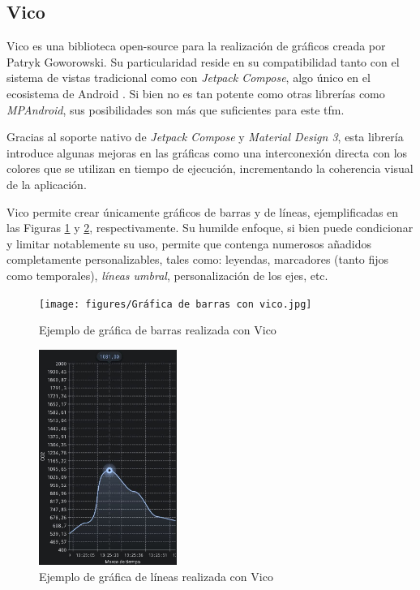     \subsection{Vico}
        
        Vico es una biblioteca \gls{open-source} para la realización de gráficos creada por Patryk Goworowski. Su particularidad reside en su compatibilidad tanto con el sistema de vistas tradicional como con \textit{Jetpack Compose}, algo único en el ecosistema de Android \cite{goworowski_vico_nodate}. Si bien no es tan potente como otras librerías como \textit{MPAndroid}, sus posibilidades son más que suficientes para este \gls{tfm}. 
        
        Gracias al soporte nativo de \textit{Jetpack Compose} y \textit{Material Design 3}, esta librería introduce algunas mejoras en las gráficas como una interconexión directa con los colores que se utilizan en tiempo de ejecución, incrementando la coherencia visual de la aplicación.

        Vico permite crear únicamente gráficos de barras y de líneas, ejemplificadas en las Figuras \ref{figure:vico:ejemplo_barras} y \ref{figure:vico:ejemplo_lineas}, respectivamente. Su humilde enfoque, si bien puede condicionar y limitar notablemente su uso, permite que contenga numerosos añadidos completamente personalizables, tales como: leyendas, marcadores (tanto fijos como temporales), \textit{líneas umbral}, personalización de los ejes, etc.

        \begin{figure}[h]
            \centering
            \texttt{[image: figures/Gráfica de barras con vico.jpg]}
            \caption{Ejemplo de gráfica de barras realizada con Vico}
            \label{figure:vico:ejemplo_barras}
        \end{figure}

        \begin{figure}[h]
            \centering
            \includegraphics[width=0.4\textwidth]{figures/Gráfica de líneas con vico.jpg}
            \caption{Ejemplo de gráfica de líneas realizada con Vico}
            \label{figure:vico:ejemplo_lineas}
        \end{figure}
        

